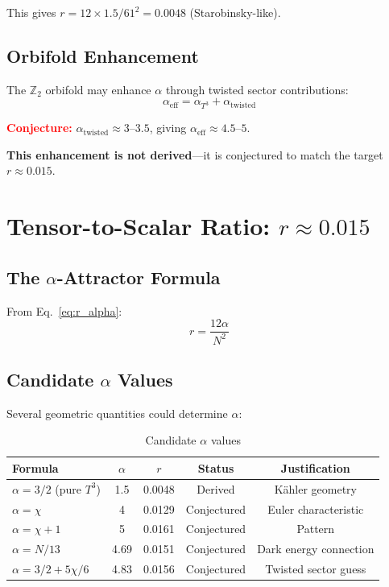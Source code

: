 \documentclass[12pt,a4paper]{article}
\begin{document}
This gives $r = 12 \times 1.5 / 61^2 = 0.0048$ (Starobinsky-like).

\subsection{Orbifold Enhancement}

The $\mathbb{Z}_2$ orbifold may enhance $\alpha$ through twisted sector contributions:
\begin{equation}
\alpha_{\text{eff}} = \alpha_{T^3} + \alpha_{\text{twisted}}
\end{equation}

\textcolor{red}{\textbf{Conjecture:}} $\alpha_{\text{twisted}} \approx 3$--$3.5$, giving $\alpha_{\text{eff}} \approx 4.5$--$5$.

\textbf{This enhancement is not derived}---it is conjectured to match the target $r \approx 0.015$.

\section{Tensor-to-Scalar Ratio: $r \approx 0.015$}

\subsection{The $\alpha$-Attractor Formula}

From Eq.~\eqref{eq:r_alpha}:
\begin{equation}
r = \frac{12\alpha}{N^2}
\end{equation}

\subsection{Candidate $\alpha$ Values}

Several geometric quantities could determine $\alpha$:

\begin{table}[h]
\centering
\begin{tabular}{lcccc}
\toprule
Formula & $\alpha$ & $r$ & Status & Justification \\
\midrule
$\alpha = 3/2$ (pure $T^3$) & 1.5 & 0.0048 & Derived & K\"ahler geometry \\
$\alpha = \chi$ & 4 & 0.0129 & Conjectured & Euler characteristic \\
$\alpha = \chi + 1$ & 5 & 0.0161 & Conjectured & Pattern \\
$\alpha = N/13$ & 4.69 & 0.0151 & Conjectured & Dark energy connection \\
$\alpha = 3/2 + 5\chi/6$ & 4.83 & 0.0156 & Conjectured & Twisted sector guess \\
\bottomrule
\end{tabular}
\caption{Candidate $\alpha$ values}
\end{table}
\end{document}
